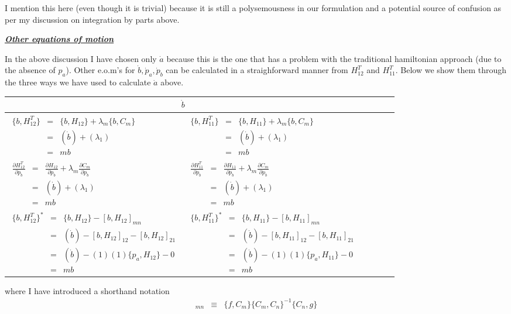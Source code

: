 \documentclass[aps,preprint,preprintnumbers,nofootinbib,showpacs,prd]{revtex4-1}
\newcommand{\ba}{\begin{array}}
\newcommand{\ea}{\end{array}}
\newcommand{\nbea}{\begin{eqnarray*}}
\newcommand{\neea}{\end{eqnarray*}}
\begin{document}
I mention this here (even though it is trivial) because it is still a polysemousness in our formulation and a potential source of confusion as per my discussion on integration by parts above.

\bigskip
\underline{\textbf{\textit{Other equations of motion}}}

In the above discussion I have chosen only $\dot a$ because this is the one that has a problem with the traditional hamiltonian approach (due to the absence of $p_a$). Other e.o.m's for $\dot b, \dot p_a, \dot p_b$ can be calculated in a straighforward manner from $H^T_{12}$ and $H^T_{11}$. Below we show them through the three ways we have used to calculate $\dot a$ above.

\begin{center}
    \begin{tabular}{ | l | l |}
    \hline
    \multicolumn{2}{|c|}{$\dot b$} \\
    \hline
    $\ba {rcl}
\{b, H^T_{12}\} & = & \{b, H_{12}\} + \lambda_m \{b, C_m\} \\
& = & (\dot b) + (\lambda_1) \\
& = & mb
\ea$
     &
    $\ba {rcl}
\{b, H^T_{11}\} & = & \{b, H_{11}\} + \lambda_m \{b, C_m\} \\
& = & (\dot b) + (\lambda_1) \\
& = & mb
\ea$
      \\ \cline{1-2}
    $\ba {rcl}
\frac{\partial H^T_{12}}{\partial p_b} & = & \frac{\partial H_{12}}{\partial p_b} + \lambda_m \frac{\partial C_m}{\partial p_b} \\
& = &  (\dot b) + (\lambda_1) \\
& = & mb
\ea$
      &
    $\ba {rcl}
\frac{\partial H^T_{11}}{\partial p_b} & = & \frac{\partial H_{11}}{\partial p_b} + \lambda_m \frac{\partial C_m}{\partial p_b} \\
& = &  (\dot b) + (\lambda_1) \\
& = & mb
\ea$
      \\ \cline{1-2}
   $\ba {rcl}
\{b, H^T_{12}\}^* & = & \{b, H_{12}\} - [b, H_{12}]_{mn} \\
& = & (\dot b) - [b, H_{12}]_{12} - [b, H_{12}]_{21} \\
& = & (\dot b) -(1)(1)\{p_a, H_{12}\} - 0 \\
& = & mb   
\ea$
   & 
   $\ba {rcl}
\{b, H^T_{11}\}^* & = & \{b, H_{11}\} - [b, H_{11}]_{mn} \\
& = & (\dot b) - [b, H_{11}]_{12} - [b, H_{11}]_{21} \\
& = & (\dot b) -(1)(1)\{p_a, H_{11}\} - 0 \\
& = & mb
   \ea$
     \\
    \hline
    \end{tabular}
\end{center}
where I have introduced a shorthand notation 
%
\nbea
[f,g]_{mn} & \equiv & \{f, C_m\}\{C_m, C_n\}^{-1}\{C_n, g\}
\neea
%
\end{document}
